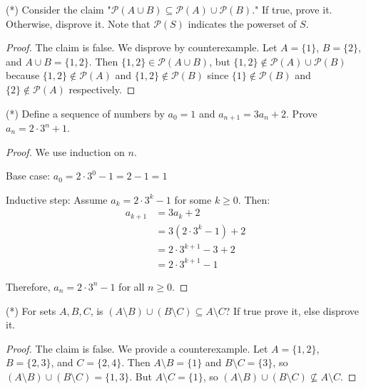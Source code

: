 \documentclass[12pt]{article}
\begin{document}
\begin{problem}
(*) Consider the claim "$\mathcal{P}(A \cup B) \subseteq \mathcal{P}(A) \cup \mathcal{P}(B)$." If true, prove it. Otherwise, disprove it. Note that $\mathcal{P}(S)$ indicates the powerset of $S$.

\begin{proof}
The claim is false. We disprove by counterexample. Let $A = \{1\}$, $B = \{2\}$, and $A \cup B = \{1, 2\}$. Then $\{1, 2\} \in \mathcal{P}(A \cup B)$, but $\{1, 2\} \notin \mathcal{P}(A) \cup \mathcal{P}(B)$ because $\{1, 2\} \notin \mathcal{P}(A)$ and $\{1, 2\} \notin \mathcal{P}(B)$ since $\{1\} \notin \mathcal{P}(B)$ and $\{2\} \notin \mathcal{P}(A)$ respectively.
\end{proof}
\end{problem}

\begin{problem}
(*) Define a sequence of numbers by $a_0 = 1$ and $a_{n+1} = 3a_n + 2$. Prove $a_n = 2 \cdot 3^n + 1$. 

\begin{proof}
We use induction on $n$.

Base case: $a_0 = 2 \cdot 3^0 - 1 = 2 - 1 = 1$

Inductive step: Assume $a_k = 2 \cdot 3^k - 1$ for some $k \geq 0$.
Then:
\begin{align*}
    a_{k+1} &= 3a_k + 2\\
    &= 3(2 \cdot 3^k - 1) + 2\\
    &= 2 \cdot 3^{k+1} - 3 + 2\\
    &= 2 \cdot 3^{k+1} - 1
\end{align*}

Therefore, $a_n = 2 \cdot 3^n - 1$ for all $n \geq 0$.
\end{proof}
\end{problem}

\begin{problem}
(*) For sets $A,B,C$, is $(A \setminus B) \cup (B \setminus C) \subseteq A \setminus C$? If true prove it, else disprove it.

\begin{proof}
The claim is false. We provide a counterexample. Let $A = \{1, 2\}$, $B = \{2, 3\}$, and $C = \{2, 4\}$. Then $A \setminus B = \{1\}$ and $B \setminus C = \{3\}$, so $(A \setminus B) \cup (B \setminus C) = \{1, 3\}$. But $A \setminus C = \{1\}$, so $(A \setminus B) \cup (B \setminus C) \not\subseteq A \setminus C$.
\end{proof}
\end{problem}
\end{document}
